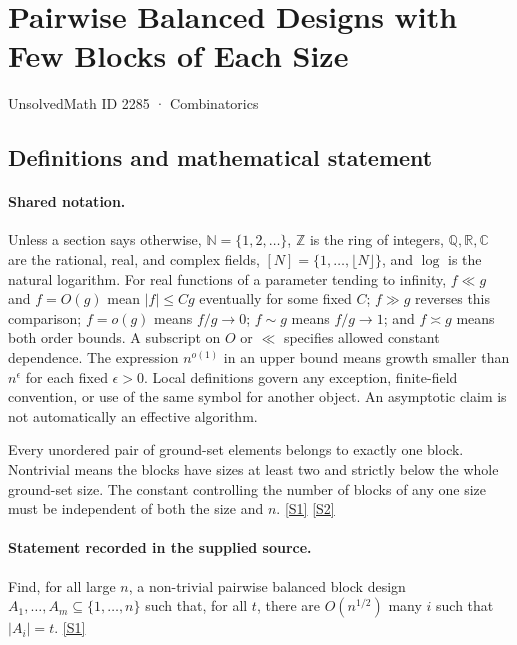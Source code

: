\documentclass[11pt,a4paper]{article}
\newcommand{\N}{\mathbb{N}}
\newcommand{\Z}{\mathbb{Z}}
\newcommand{\Q}{\mathbb{Q}}
\newcommand{\R}{\mathbb{R}}
\newcommand{\C}{\mathbb{C}}
\newcommand{\sref}[2]{\hyperlink{source:#1:#2}{[S#2]}}
\begin{document}

\setcounter{section}{2284}

\section{Pairwise Balanced Designs with Few Blocks of Each Size}\label{2285}

{\small\sffamily UnsolvedMath ID 2285 · Combinatorics}

\subsection{Definitions and mathematical statement}

\paragraph{Shared notation.}Unless a section says otherwise, $\N=\{1,2,\ldots\}$,
$\Z$ is the ring of integers, $\Q,\R,\C$ are the rational, real, and complex
fields, $[N]=\{1,\ldots,\lfloor N\rfloor\}$, and $\log$ is the natural
logarithm. For real functions of a parameter tending to infinity,
$f\ll g$ and $f=O(g)$ mean $|f|\leq Cg$ eventually for some fixed $C$;
$f\gg g$ reverses this comparison; $f=o(g)$ means $f/g\to0$;
$f\sim g$ means $f/g\to1$; and $f\asymp g$ means both order bounds.
A subscript on $O$ or $\ll$ specifies allowed constant dependence.
The expression $n^{o(1)}$ in an upper bound means growth smaller than
$n^\epsilon$ for each fixed $\epsilon>0$. Local definitions govern any
exception, finite-field convention, or use of the same symbol for another
object. An asymptotic claim is not automatically an effective algorithm.



Every unordered pair of ground-set elements belongs to exactly one block. Nontrivial means the blocks have sizes at least two and strictly below the whole ground-set size. The constant controlling the number of blocks of any one size must be independent of both the size and $n$. \sref{2285}{1} \sref{2285}{2}

\paragraph{Statement recorded in the supplied source.}
Find, for all large $n$, a non-trivial pairwise balanced block design $A_1,\ldots,A_m\subseteq \{1,\ldots,n\}$ such that, for all $t$, there are $O(n^{1/2})$ many $i$ such that $\lvert A_i\rvert=t$. \sref{2285}{1}
\end{document}
